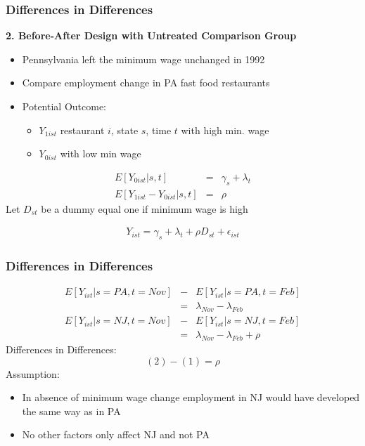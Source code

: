 \documentclass[notes=show,beamer,compress]{beamer}
\begin{document}







\begin{frame}
\frametitle{Differences in Differences}

\textbf{2. Before-After Design with Untreated Comparison Group}
\begin{itemize}
\item  Pennsylvania left the minimum wage unchanged in 1992
\item Compare employment change in PA fast food restaurants
\item Potential Outcome:
\begin {itemize}
\item $Y_{1ist}$ restaurant $i$, state $s$, time $t$  with high min. wage
\item  $Y_{0ist}$  with low min wage
\end {itemize}
\end {itemize}

 \begin{eqnarray*}
	          E[ Y_{0ist}| s,t] &=& \gamma_{s} + \lambda_{t} \\
	           E[ Y_{1ist}-Y_{0ist}| s,t] &=& \rho
  \end{eqnarray*}
Let $D_{st}$ be a dummy equal one if minimum wage is high

 \begin{eqnarray*}
  Y_{ist} =\gamma_{s} + \lambda_{t} + \rho D_{st}+ \epsilon_ {ist}
\end{eqnarray*}

\end{frame}





\begin{frame}
\frametitle{Differences in Differences }

 \begin{eqnarray}
 E[Y_{ist}| s=PA, t=Nov]&-& E[Y_{ist}| s=PA, t=Feb]  \nonumber\\
&=& \lambda_{Nov}-\lambda_{Feb} \\
E[Y_{ist}| s=NJ, t=Nov] &-&E[Y_{ist}| s=NJ, t=Feb] \nonumber\\
&=&\lambda_{Nov}-\lambda_{Feb}+ \rho
\end{eqnarray}
Differences in Differences:
\[ (2) - (1) = \rho  \]
 Assumption:
\begin {itemize}
\item In absence of minimum wage change employment in NJ would have developed the same way as in PA
\item No other factors only affect NJ and not PA
\end {itemize}

\end{frame}
\end{document}
